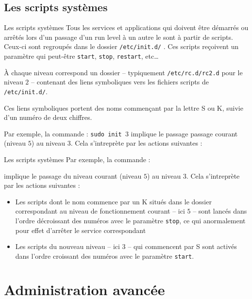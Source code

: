 \documentclass[10pt]{beamer}
\begin{document}
\subsection{Les scripts systèmes}
\begin{frame}{Les scripts systèmes}
Tous les services et applications qui doivent être démarrés ou arrêtés lors d'un passage d'un run level à un autre le sont à partir de scripts. Ceux-ci sont regroupés dans le dossier \texttt{/etc/init.d/} . Ces scripts reçoivent un paramètre qui peut-être \texttt{start}, \texttt{stop}, \texttt{restart}, etc\ldots

À chaque niveau correspond un dossier – typiquement \texttt{/etc/rc.d/rc2.d} pour le
niveau $2$ – contenant des liens symboliques vers les fichiers scripts de \texttt{/etc/init.d/}.

Ces liens symboliques portent des noms commençant par la lettre \alert{S} ou \alert{K}, suivie
d'un numéro de deux chiffres.

Par exemple, la commande : \texttt{sudo \alert{init} $3$} implique le passage passage courant (niveau $5$) au niveau $3$. Cela s'intreprète par les actions suivantes :
\end{frame}

\begin{frame}[fragile]{Les scripts systèmes}
Par exemple, la commande : 

implique le passage du niveau courant (niveau $5$) au niveau $3$. Cela s'intreprète par les actions suivantes :
\begin{itemize}
	\item Les scripts dont le nom commence par un \alert{K} situés dans le dossier correspondant au niveau de fonctionnement courant – ici $5$ – sont lancés dans l'ordre décroissant des numéros avec le paramètre \texttt{\alert{stop}}, ce qui anormalement pour effet d'arrêter le service correspondant
	\item Les scripts du nouveau niveau – ici $3$ – qui commencent par \alert{S} sont activés dans l'ordre croissant des numéros avec le paramètre \texttt{\alert{start}}.
\end{itemize}
\end{frame}

\section{Administration avancée}
\end{document}
